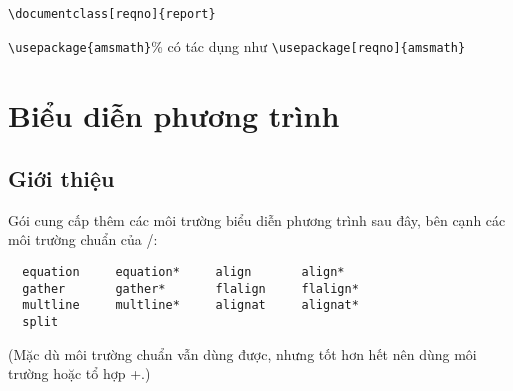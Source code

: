 \documentclass[11pt,leqno,titlepage,openany]{amsldoc}[1999/12/13]
\begin{document}
\medskip
\verb"\documentclass[reqno]{report}"\par
\indent\verb"\usepackage{amsmath}"\% có tác dụng như \verb"\usepackage[reqno]{amsmath}"


\chapter{Biểu diễn phương trình}

\section{Giới thiệu}
Gói  cung cấp thêm các môi trường biểu diễn phương trình sau
đây, bên cạnh các môi trường chuẩn của \latex/:
\begin{verbatim}
  equation     equation*     align       align*
  gather       gather*       flalign     flalign*
  multline     multline*     alignat     alignat*
  split
\end{verbatim}
(Mặc dù môi trường chuẩn  vẫn dùng được, nhưng tốt hơn hết
nên dùng môi trường  hoặc tổ hợp +.)

\medskip
\end{document}
